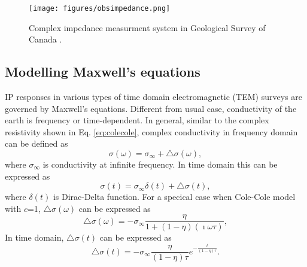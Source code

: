 \documentclass[letterpaper,11pt]{article}
\newcommand{\siginf}{\sigma_\infty}
\newcommand{\dsig}{\triangle\sigma}
\begin{document}
\begin{figure}[htb]
  \centering
  \texttt{[image: figures/obsimpedance.png]}
  \caption{Complex impedance measurment system in Geological Survey of Canada \cite[]{Enkin2012}. }
  \label{Fig:obsimpedance}
\end{figure}
\clearpage


\subsection{Modelling Maxwell's equations}
IP responses in various types of time domain electromagnetic (TEM) surveys are governed by Maxwell’s equations. Different from usual case, conductivity of the earth is frequency or time-dependent. In general, similar to the complex resistivity shown in Eq. \ref{eq:colecole}, complex conductivity in frequency domain can be defined as 
\begin{equation}
  \sigma(\omega) = \siginf + \dsig(\omega),
  \label{eq:sigmaomega}
\end{equation}
where $\siginf$ is conductivity at infinite frequency.
In time domain this can be expressed as
\begin{equation}
  \sigma(t) = \siginf\delta(t) + \dsig(t),
  \label{eq:sigmat}
\end{equation}
where $\delta(t)$ is Dirac-Delta function. For a specical case when Cole-Cole model with $c$=1, $\dsig(\omega)$ can be expressed as 
\begin{equation}
  \dsig(\omega)= -\sigma_{\infty}\frac{\eta}{1+(1-\eta)(\imath\omega\tau)},
\end{equation}
In time domain, $\dsig(t)$ can be expressed as 
\begin{equation}
  \dsig(t)=-\siginf\frac{\eta}{(1-\eta)\tau}e^{-\frac{t}{(1-\eta)\tau}}.  
\end{equation}
\end{document}
